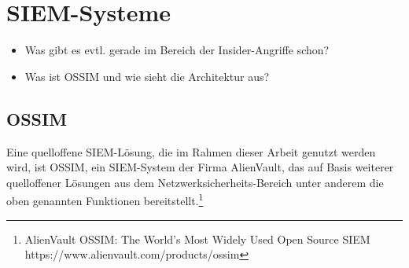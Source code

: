 \section{SIEM-Systeme}

\label{sec_state_siem}

\begin{itemize}
  \item Was gibt es evtl. gerade im Bereich der Insider-Angriffe schon?
  \item Was ist OSSIM und wie sieht die Architektur aus?
\end{itemize}

\subsection{OSSIM}

Eine quelloffene SIEM-Lösung, die im Rahmen dieser Arbeit genutzt werden wird, ist OSSIM, ein SIEM-System der Firma AlienVault, das auf Basis weiterer quelloffener Lösungen aus dem Netzwerksicherheits-Bereich unter anderem die oben genannten Funktionen bereitstellt.\footnote{
	AlienVault OSSIM: The World’s Most Widely Used Open Source SIEM\\https://www.alienvault.com/products/ossim
}
